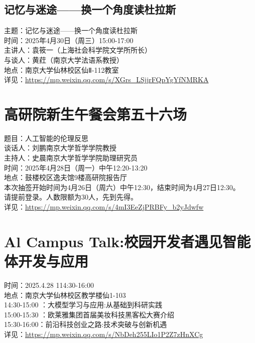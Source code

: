 \documentclass[letterpaper, 12pt]{article}
\begin{document}
\begin{multicols}{2}
\subsection{记忆与迷途——换一个角度读杜拉斯} %
主题：记忆与迷途——换一个角度读杜拉斯
\\时间：2025年4月30日（周三）15:00-17:00
\\主讲人：袁筱一（上海社会科学院文学所所长）
\\与谈人：黄荭（南京大学法语系教授）
\\地点：南京大学仙林校区仙Ⅱ-112教室
\\详见：\url{https://mp.weixin.qq.com/s/XGrs_LSjjrFQpYgYfNMRKA}
\section{高研院新生午餐会第五十六场} %
题目：人工智能的伦理反思
\\谈话人：刘鹏南京大学哲学学院教授
\\主持人：史晨南京大学哲学学院助理研究员
\\时间：2025年4月28日（周一）中午12:20-13:20
\\地点：鼓楼校区逸夫馆9楼高研院报告厅
\\本次抽签开始时间为4月26日（周六）中午12:30，结束时间为4月27日12:30。
\\请提前登录。人数限额为30人，先到先得。
\\详见：\url{https://mp.weixin.qq.com/s/4mI3EeZjPRBFy_b2yJdwfw}

\section{Al Campus Talk:校园开发者遇见智能体开发与应用} %
时间：2025.4.28 114:30-16:00
\\地点：南京大学仙林校区教学楼仙1-103
\\14:30-15:00 ：大模型学习与应用:从基础到科研实践
\\15:00-15:30 ：欧莱雅集团首届美妆科技黑客松大赛介绍
\\15:30-16:00：前沿科技创业之路:技术突破与创新机遇
\\详见：\url{https://mp.weixin.qq.com/s/NbDeh255LIo1P2Z7zHnXCg}


\end{multicols}
\end{document}
